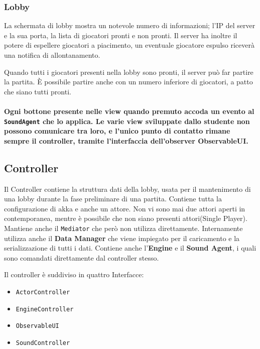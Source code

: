     \subsubsection{Lobby}
        La schermata di lobby mostra un notevole numero di informazioni; l'IP del server e la sua porta, la lista di giocatori pronti e non pronti.
        Il server ha inoltre il potere di espellere giocatori a piacimento, un eventuale giocatore espulso riceverà una notifica di allontanamento.
        
        Quando tutti i giocatori presenti nella lobby sono pronti, il server può far partire la partita. È possibile partire anche con un numero inferiore di giocatori, a patto che siano tutti pronti.
        
    \paragraph{Ogni bottone presente nelle view quando premuto accoda un evento al \texttt{SoundAgent} che lo applica.
    Le varie view sviluppate dallo studente non possono comunicare tra loro, e l'unico punto di contatto rimane sempre il controller, tramite l'interfaccia dell'observer ObservableUI.}

    \subsection{Controller}
        Il Controller contiene la struttura dati della lobby, usata per il mantenimento di una lobby durante la fase
        preliminare di una partita.
        Contiene tutta la configurazione di akka e anche un attore.
        Non vi sono mai due attori aperti in contemporanea, 
        mentre è possibile che non siano presenti attori(Single Player).
        Mantiene anche il \texttt{Mediator} che però non utilizza direttamente.
        Internamente utilizza anche il \textbf{Data Manager} che viene impiegato per il caricamento e la serializzazione di tutti i dati.
        Contiene anche l'\textbf{Engine} e il \textbf{Sound Agent}, i quali sono comandati direttamente dal controller stesso.
        
        Il controller è suddiviso in quattro Interfacce:
        \begin{itemize}
	        \item \texttt{ActorController}
	        \item \texttt{EngineController}
	        \item \texttt{ObservableUI}
        	\item \texttt{SoundController}
        \end{itemize}
        
